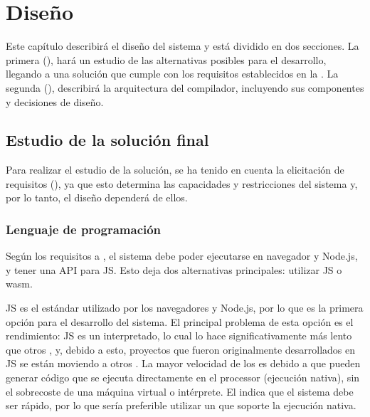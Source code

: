 \chapter{Diseño}\label{chap:design}

Este capítulo describirá el diseño del sistema y está dividido en dos
secciones. La primera (), hará un estudio de las
alternativas posibles para el desarrollo, llegando a una solución que cumple con
los requisitos establecidos en la . La segunda
(), describirá la arquitectura del compilador,
incluyendo sus componentes y decisiones de diseño.

\section{Estudio de la solución final}\label{sec:solution_study}

Para realizar el estudio de la solución, se ha tenido en cuenta la elicitación
de requisitos (), ya que esto determina las capacidades
y restricciones del sistema y, por lo tanto, el diseño dependerá de ellos.

\subsection{Lenguaje de programación}\label{subsec:language}

Según los requisitos  a , el sistema
debe poder ejecutarse en navegador y Node.js, y tener una \gls{API} para
\gls{JS}. Esto deja dos alternativas principales: utilizar \gls{JS} o
\gls{wasm}.

\gls{JS} es el  estándar utilizado por
los navegadores y Node.js, por lo que es la primera opción para el desarrollo
del sistema. El principal problema de esta opción es el rendimiento: \gls{JS} es
un  interpretado, lo cual lo hace
significativamente más lento que otros 
, y, debido a esto, proyectos que fueron
originalmente desarrollados en \gls{JS} se están moviendo a otros
 \parencite{typescript-go}. La mayor
velocidad de los 
 es debido a que pueden generar código que se
ejecuta directamente en el \gls{processor} (ejecución nativa), sin el sobrecoste
de una máquina virtual o intérprete. El  indica que el
sistema debe ser rápido, por lo que sería preferible utilizar un
 que soporte la ejecución nativa.

